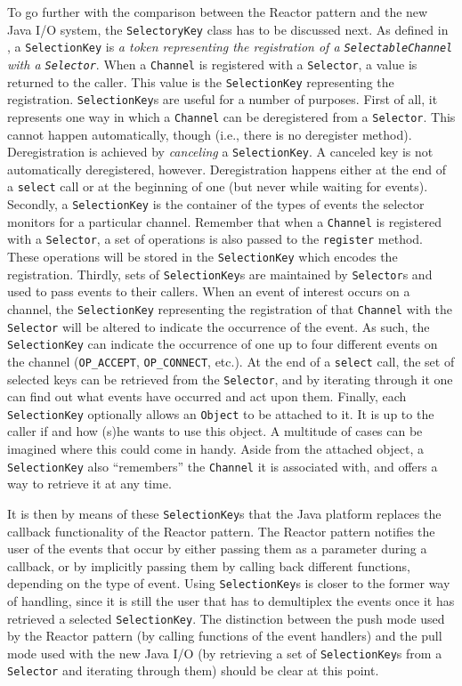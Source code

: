 \documentclass[a4paper,10pt]{article}
\begin{document}
To go further with the comparison between the Reactor pattern and the new Java I/O system, the \texttt{SelectoryKey}
class has to be discussed next. As defined in \cite{javadoc}, a \texttt{SelectionKey} is \textit{a token representing the
registration of a \texttt{SelectableChannel} with a \texttt{Selector}}. When a \texttt{Channel} is registered with a
\texttt{Selector}, a value is returned to the caller. This value is the \texttt{SelectionKey} representing the registration.
\texttt{SelectionKey}s are useful for a number of purposes. First of all, it represents one way in which a \texttt{Channel}
can be deregistered from a \texttt{Selector}. This cannot happen automatically, though (i.e., there is no deregister method).
Deregistration is achieved by \textit{canceling} a \texttt{SelectionKey}. A canceled key is not automatically deregistered,
however. Deregistration happens either at the end of a \texttt{select} call or at the beginning of one (but never while waiting for
events). Secondly, a \texttt{SelectionKey} is the container of the types of events the selector monitors for a particular channel.
Remember that when a \texttt{Channel} is registered with a \texttt{Selector}, a set of operations is also passed to the
\texttt{register} method. These operations will be stored in the \texttt{SelectionKey} which encodes the registration.
Thirdly, sets of \texttt{SelectionKey}s are maintained by \texttt{Selector}s and used to pass events to their callers. When
an event of interest occurs on a channel, the \texttt{SelectionKey} representing the registration of that \texttt{Channel}
with the \texttt{Selector} will be altered to indicate the occurrence of the event. As such, the \texttt{SelectionKey} can
indicate the occurrence of one up to four different events on the channel (\texttt{OP\_ACCEPT}, \texttt{OP\_CONNECT}, etc.).
At the end of a \texttt{select} call, the set of selected keys can be retrieved from the \texttt{Selector}, and by iterating through
it one can find out what events have occurred and act upon them. Finally, each \texttt{SelectionKey} optionally allows an
\texttt{Object} to be attached to it. It is up to the caller if and how (s)he wants to use this object. A multitude of cases can
be imagined where this could come in handy. Aside from the attached object, a \texttt{SelectionKey} also ``remembers''
the \texttt{Channel} it is associated with, and offers a way to retrieve it at any time.

It is then by means of these \texttt{SelectionKey}s that the Java platform replaces the callback functionality of the Reactor
pattern. The Reactor pattern notifies the user of the events that occur by either passing them as a parameter during a
callback, or by implicitly passing them by calling back different functions, depending on the type of event. Using \texttt{SelectionKey}s
is closer to the former way of handling, since it is still the user that has to demultiplex the events once it has retrieved a selected
\texttt{SelectionKey}. The distinction between the push mode used by the Reactor pattern (by calling functions of the event
handlers) and the pull mode used with the new Java I/O (by retrieving a set of \texttt{SelectionKey}s from a \texttt{Selector}
and iterating through them) should be clear at this point.
\end{document}
